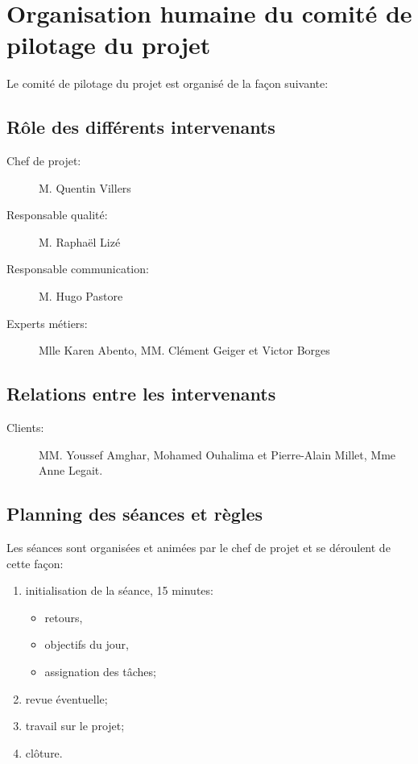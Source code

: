 \documentclass[twoside]{article}
\begin{document}



\section{Organisation humaine du comité de pilotage du projet}

Le comité de pilotage du projet est organisé de la façon suivante:

    \subsection{Rôle des différents intervenants}
\begin{description}
\item[Chef de projet:]M. Quentin Villers
\item[Responsable qualité:]M. Raphaël Lizé
\item[Responsable communication:]M. Hugo Pastore
\item[Experts métiers:]Mlle Karen Abento, MM. Clément Geiger et Victor Borges
\end{description}

    \subsection{Relations entre les intervenants}
\begin{description}
\item[Clients:]MM. Youssef Amghar, Mohamed Ouhalima et Pierre-Alain Millet,
Mme Anne Legait.
\end{description}

    \subsection{Planning des séances et règles}
Les séances sont organisées et animées par le chef de projet et se
déroulent de cette façon:
\begin{enumerate}
\item initialisation de la séance, 15 minutes:
    \begin{itemize}
        \item retours,
        \item objectifs du jour,
        \item assignation des tâches;
    \end{itemize}
\item revue éventuelle;
\item travail sur le projet;
\item clôture.
\end{enumerate}
\end{document}
